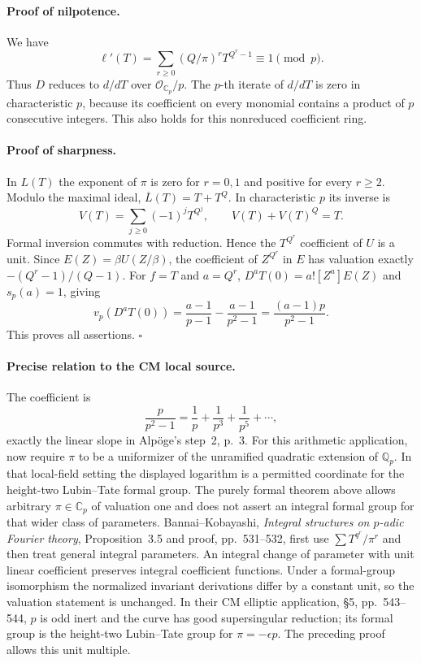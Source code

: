 \documentclass[11pt]{article}
\newcommand{\Q}{\mathbb Q}\newcommand{\C}{\mathbb C}\newcommand{\Z}{\mathbb Z}\newcommand{\R}{\mathbb R}\newcommand{\A}{\mathbb A}\newcommand{\OO}{\mathcal O}
\theoremstyle{definition}\newtheorem{definition}[theorem]{Definition}\newtheorem{remark}[theorem]{Remark}
\begin{document}
\paragraph{Proof of nilpotence.}
We have
\[
 \ell'(T)=\sum_{r\geq0}(Q/\pi)^rT^{Q^r-1}\equiv1\pmod p.
\]
Thus $D$ reduces to $d/dT$ over $\mathcal O_{\C_p}/p$.
The $p$-th iterate of $d/dT$ is zero in characteristic $p$, because
its coefficient on every monomial contains a product of $p$
consecutive integers. This also holds for this nonreduced
coefficient ring.

\paragraph{Proof of sharpness.}
In $L(T)$ the exponent of $\pi$ is zero for $r=0,1$ and positive
for every $r\geq2$. Modulo the maximal ideal,
$\overline L(T)=T+T^Q$. In characteristic $p$ its inverse is
\[
 V(T)=\sum_{j\geq0}(-1)^jT^{Q^j},\qquad V(T)+V(T)^Q=T.
\]
Formal inversion commutes with reduction. Hence the
$T^{Q^r}$ coefficient of $U$ is a unit. Since
$E(Z)=\beta U(Z/\beta)$, the coefficient of $Z^{Q^r}$ in $E$
has valuation exactly $-(Q^r-1)/(Q-1)$. For $f=T$ and $a=Q^r$,
$D^aT(0)=a![Z^a]E(Z)$ and $s_p(a)=1$, giving
\[
 v_p(D^aT(0))=
 \frac{a-1}{p-1}-\frac{a-1}{p^2-1}
 =\frac{(a-1)p}{p^2-1}.
\]
This proves all assertions. $\square$

\paragraph{Precise relation to the CM local source.}
The coefficient is
\[
 \frac{p}{p^2-1}=\frac1p+\frac1{p^3}+\frac1{p^5}+\cdots,
\]
exactly the linear slope in Alp\"oge's step~2, p.~3.
For this arithmetic application, now require $\pi$ to be a
uniformizer of the unramified quadratic extension of $\Q_p$.
In that local-field setting the displayed logarithm is a permitted
coordinate for the height-two Lubin--Tate formal group.
The purely formal theorem above allows arbitrary $\pi\in\C_p$
of valuation one and does not assert an integral formal group for
that wider class of parameters.
Bannai--Kobayashi, \emph{Integral structures on $p$-adic Fourier
theory}, Proposition~3.5 and proof, pp.~531--532, first use
$\sum T^{q^r}/\pi^r$ and then treat general integral parameters.
An integral change of parameter with unit linear coefficient
preserves integral coefficient functions. Under a formal-group
isomorphism the normalized invariant derivations differ by a
constant unit, so the valuation statement is unchanged.
In their CM elliptic application, \S5, pp.~543--544, $p$ is odd
inert and the curve has good supersingular reduction; its formal
group is the height-two Lubin--Tate group for
$\pi=-\epsilon p$. The preceding proof allows this unit multiple.
\end{document}
